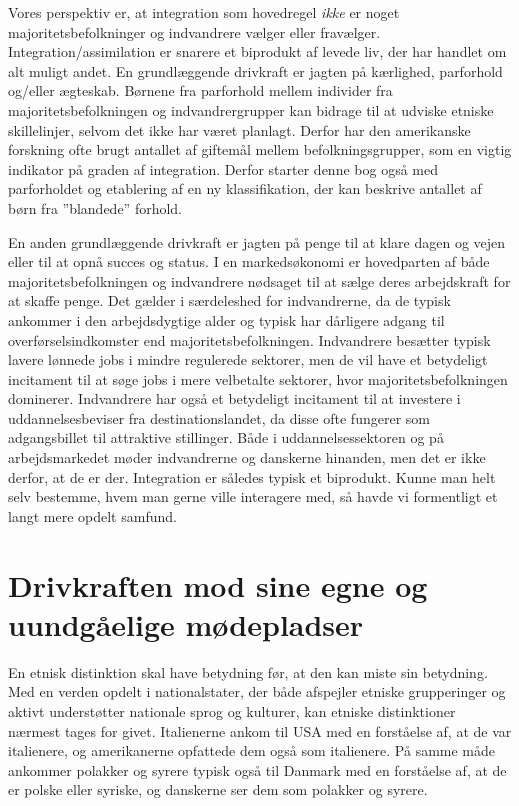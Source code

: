 \documentclass[
]{book}
\begin{document}
Vores perspektiv er, at integration som hovedregel \emph{ikke} er noget majoritetsbefolkninger og indvandrere vælger eller fravælger. Integration/assimilation er snarere et biprodukt af levede liv, der har handlet om alt muligt andet. En grundlæggende drivkraft er jagten på kærlighed, parforhold og/eller ægteskab. Børnene fra parforhold mellem individer fra majoritetsbefolkningen og indvandrergrupper kan bidrage til at udviske etniske skillelinjer, selvom det ikke har været planlagt. Derfor har den amerikanske forskning ofte brugt antallet af giftemål mellem befolkningsgrupper, som en vigtig indikator på graden af integration. Derfor starter denne bog også med parforholdet og etablering af en ny klassifikation, der kan beskrive antallet af børn fra ''blandede'' forhold.

En anden grundlæggende drivkraft er jagten på penge til at klare dagen og vejen eller til at opnå succes og status. I en markedsøkonomi er hovedparten af både majoritetsbefolkningen og indvandrere nødsaget til at sælge deres arbejdskraft for at skaffe penge. Det gælder i særdeleshed for indvandrerne, da de typisk ankommer i den arbejdsdygtige alder og typisk har dårligere adgang til overførselsindkomster end majoritetsbefolkningen. Indvandrere besætter typisk lavere lønnede jobs i mindre regulerede sektorer, men de vil have et betydeligt incitament til at søge jobs i mere velbetalte sektorer, hvor majoritetsbefolkningen dominerer. Indvandrere har også et betydeligt incitament til at investere i uddannelsesbeviser fra destinationslandet, da disse ofte fungerer som adgangsbillet til attraktive stillinger. Både i uddannelsessektoren og på arbejdsmarkedet møder indvandrerne og danskerne hinanden, men det er ikke derfor, at de er der. Integration er således typisk et biprodukt. Kunne man helt selv bestemme, hvem man gerne ville interagere med, så havde vi formentligt et langt mere opdelt samfund.

\section{Drivkraften mod sine egne og uundgåelige mødepladser}\label{drivkraften-mod-sine-egne-og-uundguxe5elige-muxf8depladser}

En etnisk distinktion skal have betydning før, at den kan miste sin betydning. Med en verden opdelt i nationalstater, der både afspejler etniske grupperinger og aktivt understøtter nationale sprog og kulturer, kan etniske distinktioner nærmest tages for givet. Italienerne ankom til USA med en forståelse af, at de var italienere, og amerikanerne opfattede dem også som italienere. På samme måde ankommer polakker og syrere typisk også til Danmark med en forståelse af, at de er polske eller syriske, og danskerne ser dem som polakker og syrere.
\end{document}

